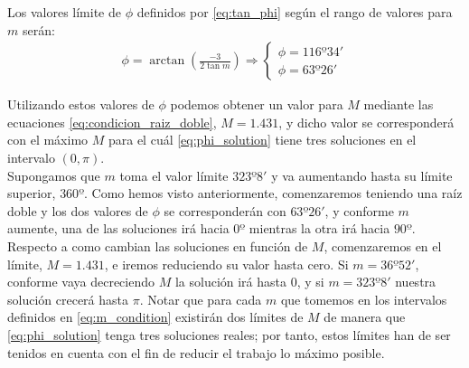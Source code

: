 \documentclass[11pt]{book}
\newcommand\ddfrac[2]{\frac{\displaystyle #1}{\displaystyle #2}}
\begin{document}
Los valores límite de $\phi$ definidos por \eqref{eq:tan_phi} según el rango de valores para $m$ serán:
\begin{align}
\phi=\arctan{(\ddfrac{-3}{2\tan{m}})} \Longrightarrow
\left\{
\begin{array}{l}
	\phi=116º34'\\
	\phi=63º26'
\end{array}
\right.
\end{align}

Utilizando estos valores de $\phi$ podemos obtener un valor para $M$ mediante las ecuaciones \eqref{eq:condicion_raiz_doble}, $M=1.431$, y dicho valor se corresponderá con el máximo $M$ para el cuál \eqref{eq:phi_solution} tiene tres soluciones en el intervalo $(0,\pi)$.\\

Supongamos que $m$ toma el valor límite $323º8'$ y va aumentando hasta su límite superior, $360º$. Como hemos visto anteriormente, comenzaremos teniendo una raíz doble y los dos valores de $\phi$ se corresponderán con $63º26'$, y conforme $m$ aumente, una de las soluciones irá hacia $0º$ mientras la otra irá hacia $90º$. Respecto a como cambian las soluciones en función de $M$, comenzaremos en el límite, $M=1.431$, e iremos reduciendo su valor hasta cero. Si $m=36º52'$, conforme vaya decreciendo $M$ la solución irá hasta $0$, y si $m=323º8'$ nuestra solución crecerá hasta $\pi$. Notar que para cada $m$ que tomemos en los intervalos definidos en \eqref{eq:m_condition} existirán dos límites de $M$ de manera que \eqref{eq:phi_solution} tenga tres soluciones reales; por tanto, estos límites han de ser tenidos en cuenta con el fin de reducir el trabajo lo máximo posible.\\




\newpage
\end{document}
